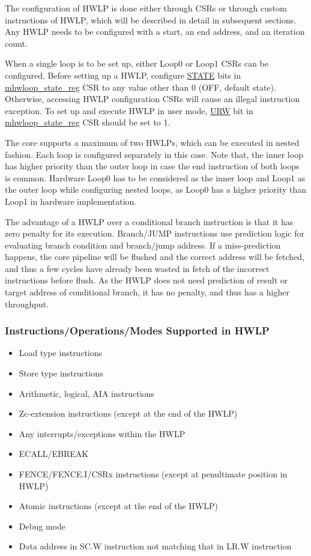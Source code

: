 \documentclass[main\_\_EN.tex]{subfiles}
\begin{document}
The configuration of HWLP is done either through CSRs or through custom instructions of HWLP, which will be described in detail in subsequent sections. Any HWLP needs to be configured with a start, an end address, and an iteration count.

When a single loop is to be set up, either Loop0 or Loop1 CSRs can be configured. Before setting up a HWLP, configure \hyperref[regdesc:mhwlp_state_reg]{STATE} bits in \hyperref[sec:riscvcpu-hwloop-reg-desc]{mhwloop\_state\_reg} CSR to any value other than 0 (OFF, default state). Otherwise, accessing HWLP configuration CSRs will cause an illegal instruction exception. To set up and execute HWLP in user mode, \hyperref[regdesc:mhwlp_state_reg]{URW} bit in \hyperref[sec:riscvcpu-hwloop-reg-desc]{mhwloop\_state\_reg} CSR should be set to 1.

The core supports a maximum of two HWLPs, which can be executed in nested fashion. Each loop is configured separately in this case. Note that, the inner loop has higher priority than the outer loop in case the end instruction of both loops is common. Hardware Loop0 has to be considered as the inner loop and Loop1 as the outer loop while configuring nested loops, as Loop0 has a higher priority than Loop1 in hardware implementation.

The advantage of a HWLP over a conditional branch instruction is that it has zero penalty for its execution. Branch/JUMP instructions use prediction logic for evaluating branch condition and branch/jump address. If a miss-prediction happens, the core pipeline will be flushed and the correct address will be fetched, and thus a few cycles have already been wasted in fetch of the incorrect instructions before flush. As the HWLP does not need prediction of result or target address of conditional branch, it has no penalty, and thus has a higher throughput.

\subsubsection{Instructions/Operations/Modes Supported in HWLP}
\label{sec:riscvcpu-hwloop-inst}

\begin{itemize}
    \item Load type instructions
    \item Store type instructions
    \item Arithmetic, logical, AIA instructions
    \item Zc-extension instructions (except at the end of the HWLP)
    \item Any interrupts/exceptions within the HWLP
    \item ECALL/EBREAK
    \item FENCE/FENCE.I/CSRx instructions (except at penultimate position in HWLP)
    \item Atomic instructions (except at the end of the HWLP)
    \item Debug mode
    \item Data address in SC.W instruction not matching that in LR.W instruction
\end{itemize}
\end{document}
